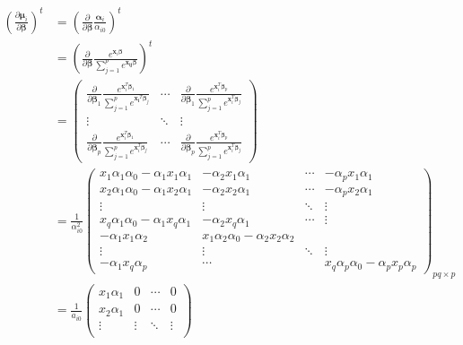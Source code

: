 \documentclass[10pt]{article}
\theoremstyle{definition}
\begin{document}
\begin{align*}
  \left(\frac{\partial  \boldsymbol\mu_i }{\partial \boldsymbol\beta}\right)^t &= \left(\frac{\partial  }{\partial \boldsymbol \beta} \frac{\boldsymbol\alpha_{i}}{\alpha_{i0}} \right)^t\\
  &= \left(\frac{\partial  }{\partial \boldsymbol \beta} \frac{e^{\mathbf{x}_i \boldsymbol\beta}}{\sum_{j = 1}^pe^{\mathbf{x_{ij}}\boldsymbol\beta}} \right)^t\\
  &= \begin{pmatrix}
        \frac{\partial }{\partial \boldsymbol\beta_1}\frac{e^{\mathbf{x}_i^T \boldsymbol\beta_1}}{\sum_{j = 1}^pe^{\mathbf{x_i}^T \boldsymbol\beta_j}} & \cdots & \frac{\partial  }{\partial \boldsymbol\beta_1}\frac{e^{\mathbf{x}_i^T \boldsymbol\beta_p}}{\sum_{j = 1}^pe^{\mathbf{x}_i^T \boldsymbol\beta_j}}\\
        \vdots & \ddots & \vdots \\
        \frac{\partial  }{\partial \boldsymbol\beta_p}\frac{e^{\mathbf{x}_i^T \boldsymbol\beta_1}}{\sum_{j = 1}^pe^{\mathbf{x}_i^T \boldsymbol\beta_j}} & \cdots & \frac{\partial  }{\partial \boldsymbol\beta_p}\frac{e^{\mathbf{x}_i^T \boldsymbol\beta_p}}{\sum_{j = 1}^pe^{\mathbf{x}_i^T \boldsymbol\beta_j}}
  \end{pmatrix}\\
  &= \frac{1}{\alpha_{i0}^2} \begin{pmatrix} x_1 \alpha_1 \alpha_0 - \alpha_1 x_1 \alpha_1 & - \alpha_2 x_1 \alpha_1 & \cdots & - \alpha_p x_1 \alpha_1 \\
x_2 \alpha_1 \alpha_0 - \alpha_1 x_2 \alpha_1 & - \alpha_2 x_2 \alpha_1 & \cdots & -\alpha_p x_2 \alpha_1 \\
\vdots & \vdots &  \ddots & \vdots \\
x_q\alpha_1\alpha_0 - \alpha_1 x_q\alpha_1 & - \alpha_2 x_q \alpha_1 &  \cdots  & \vdots  \\
- \alpha_1x_1\alpha_2 & x_1 \alpha_2\alpha_0 - \alpha_2 x_2\alpha_2 &   & \\
\vdots & \vdots & \ddots & \vdots \\
- \alpha_1x_q\alpha_p & \cdots  & & x_q\alpha_p\alpha_0 - \alpha_px_p\alpha_p
\end{pmatrix}_{pq \times p}\\
&= \frac{1}{a_{i0}} \begin{pmatrix}x_1 \alpha_1 & 0 & \cdots & 0 \\
x_2 \alpha_1 & 0 & \cdots & 0 \\
\vdots & \vdots & \ddots & \vdots \\

\end{pmatrix}
\end{align*}
\end{document}
